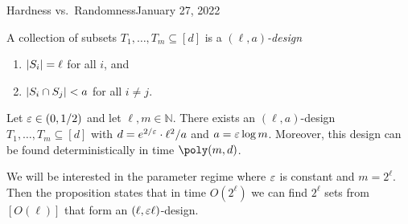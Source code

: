 \begin{lecture}{2}{Hardness vs.\ Randomness}{January 27, 2022}
\begin{definition}
  A collection of subsets $T_1, \dots, T_m \subseteq [d]$ is a \emph{$(\ell, a)$-design}
	\begin{enumerate}
    \item $\lvert S_i\rvert = \ell$ for all $i$, and
		\item $\lvert S_i \cap S_j\rvert < a$ for all $i \ne j$.
	\end{enumerate}
\end{definition}

\begin{proposition}
  \label{prop:design}
  Let $\varepsilon \in (0, 1/2)$ and let $\ell, m \in \mathbb{N}$. There exists an
  $(\ell, a)$-design $T_1, \dots, T_m \subseteq [d]$ with $d = e^{2/\varepsilon} \cdot
  \ell^2/a$ and $a = \varepsilon \log{m}$. Moreover, this design can be found
  deterministically in time $\poly(m, d)$.
\end{proposition}

We will be interested in the parameter regime where $\varepsilon$ is constant and $m =
2^\ell$. Then the proposition states that in time $O(2^\ell)$ we can find
$2^\ell$ sets from $[O(\ell)]$ that form an $(\ell, \varepsilon \ell)$-design.


\end{lecture}
